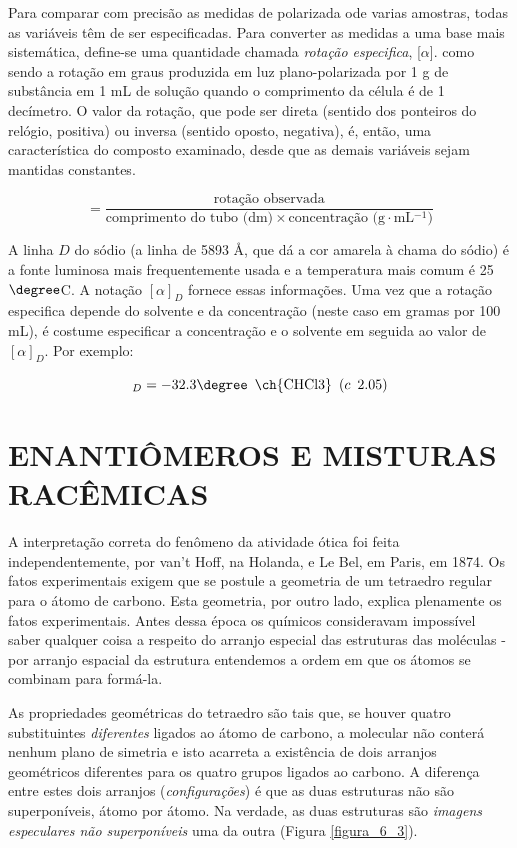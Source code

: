 Para comparar com precisão as medidas de polarizada ode varias amostras, todas as variáveis têm de ser especificadas. Para converter as medidas a uma base mais sistemática, define-se uma quantidade chamada \textit{rotação especifica}, [$\alpha$]. como sendo a rotação em graus produzida em luz plano-polarizada por 1 g de substância em 1 mL de solução quando o comprimento da célula é de 1 decímetro. O valor da rotação, que pode ser direta (sentido dos ponteiros do relógio, positiva) ou inversa (sentido oposto, negativa), é, então, uma característica do composto examinado, desde que as demais variáveis sejam mantidas constantes.

\begin{equation}
    [\alpha] = \dfrac{\text{rotação observada}}{\text{comprimento do tubo (dm)} \times \text{concentração (g$\cdot$mL$^{-1}$)}}
\end{equation}

\noindent A linha $D$ do sódio (a linha de 5893 \AA, que dá a cor amarela à chama do sódio) é a fonte luminosa mais frequentemente usada e a temperatura mais comum é 25$\degree$C. A notação $[\alpha]_D$ fornece essas informações. Uma vez que a rotação especifica depende do solvente e da concentração (neste caso em gramas por 100 mL), é costume especificar a concentração e o solvente em seguida ao valor de $[\alpha]_D$. Por exemplo:

\begin{equation}
    [\alpha]_D = -32.3 \degree \enspace \text{\ch{CHCl3}} \enspace (c \enspace 2.05)
\end{equation}

\section{ENANTIÔMEROS E MISTURAS RACÊMICAS}

A interpretação correta do fenômeno da atividade ótica foi feita independentemente, por van't Hoff, na Holanda, e Le Bel, em Paris, em 1874. Os fatos experimentais exigem que se postule a geometria de um tetraedro regular para o átomo de carbono. Esta geometria, por outro lado, explica plenamente os fatos experimentais. Antes dessa época os químicos consideravam impossível saber qualquer coisa a respeito do arranjo especial das estruturas das moléculas - por arranjo espacial da estrutura entendemos a ordem em que os átomos se combinam para formá-la.

As propriedades geométricas do tetraedro são tais que, se houver quatro substituintes \textit{diferentes} ligados ao átomo de carbono, a molecular não conterá nenhum plano de simetria e isto acarreta a existência de dois arranjos geométricos diferentes para os quatro grupos ligados ao carbono. A diferença entre estes dois arranjos (\textit{configurações}) é que as duas estruturas não são superponíveis, átomo por átomo. Na verdade, as duas estruturas são \textit{imagens especulares não superponíveis} uma da outra (Figura \ref{figura_6_3}).

